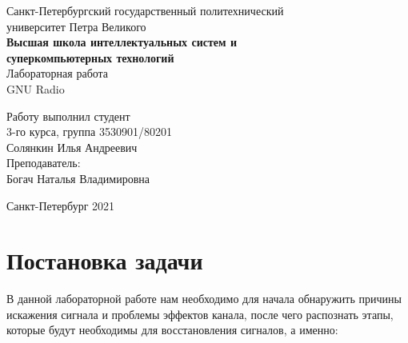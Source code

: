 \documentclass[a4paper]{article}
\begin{document}
    \begin{center}
        \begin{center}
        \hfill \break
        \normalsize{Санкт-Петербургский государственный политехнический}\\
        \normalsize{университет Петра Великого}\\
        \hfill \break
        \normalsize{\textbf{Высшая школа интеллектуальных систем и}}\\ 
        \normalsize{\textbf{суперкомпьютерных технологий}}\\ 
        \hfill \break
        \hfill \break
        \hfill \break
        \normalsize{Лабораторная работа}\\
        \hfill \break
        \hfill \break
        \normalsize{\LARGE GNU Radio}\\
        \end{center}
        \hfill \break
        \hfill \break
        \hfill \break
        \hfill \break
        \hfill \break
        \hfill \break
        \hfill \break
        \hfill \break
        \hfill \break
        \hfill \break
        \begin{flushright}
            \normalsize{Работу выполнил студент}\\
            \normalsize{3-го курса, группа 3530901/80201}\\
            \normalsize{Солянкин Илья Андреевич}\\
            \hfill \break
            \normalsize{Преподаватель:}\\
            \normalsize{Богач Наталья Владимировна}\\
        \end{flushright}
        \hfill \break
        \hfill \break
        \hfill \break
        \hfill \break
        \begin{center} Санкт-Петербург 2021 \end{center}
        \thispagestyle{empty}
    \end{center}
    
    \newpage
        \tableofcontents
    
    \newpage
         \listoffigures 
         
    \newpage
        \section{Постановка задачи}
            В данной лабораторной работе нам необходимо для начала обнаружить причины искажения сигнала и проблемы эффектов канала, после чего распознать этапы, которые будут необходимы для восстановления сигналов, а именно:
            
\end{document}
